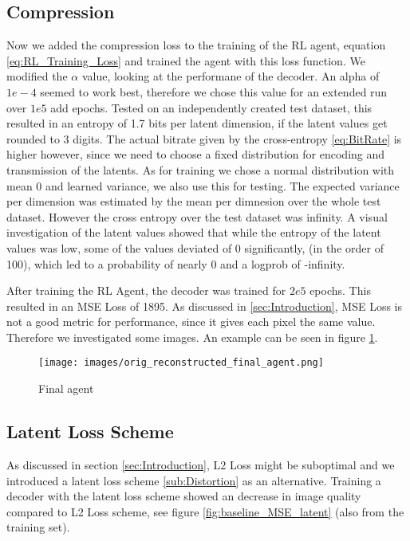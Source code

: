 \subsection{Compression}
Now we added the compression loss to the training of the RL agent, equation
\ref{eq:RL_Training_Loss} and trained the agent with this loss function. We
modified the $\alpha$ value, looking at the performane of the decoder. An alpha
of $1e-4$ seemed to work best, therefore we chose this value for an
extended run over $1e5$ add epochs. Tested on an independently created test
dataset, this resulted in an entropy of 1.7 bits per latent dimension, if the
latent values get rounded to 3 digits. The actual bitrate given by the
cross-entropy \ref{eq:BitRate} is higher however, since we need to choose a
fixed distribution for encoding and transmission of the latents. As for training
we chose a normal distribution with mean 0 and learned variance, we also use
this for testing. The expected variance per dimension was estimated by the mean
per dimnesion over the whole test dataset. However the cross entropy over the
test dataset was infinity. A visual investigation of the latent values showed
that while the entropy of the latent values was low, some of the values deviated
of 0 significantly, (in the order of 100), which led to a probability of nearly
0 and a logprob of -infinity.

After training the RL Agent, the decoder was trained for $2e5$ epochs. This
resulted in an MSE Loss of 1895. As discussed in \ref{sec:Introduction}, MSE
Loss is not a good metric for performance, since it gives each pixel the same
value. Therefore we investigated some images. An example can be seen in figure
\ref{fig:final_agent}.
\begin{figure}[H]
    \centering
    \texttt{[image: images/orig\_reconstructed\_final\_agent.png]}
    \caption{Final agent}
    \label{fig:final_agent}
\end{figure}

\subsection{Latent Loss Scheme}
As discussed in section \ref{sec:Introduction}, L2 Loss might be suboptimal and
we introduced a latent loss scheme \ref{sub:Distortion} as an alternative.
Training a decoder with the latent loss scheme showed an decrease in image
quality compared to L2 Loss scheme, see figure \ref{fig:baseline_MSE_latent}
(also from the training set).

